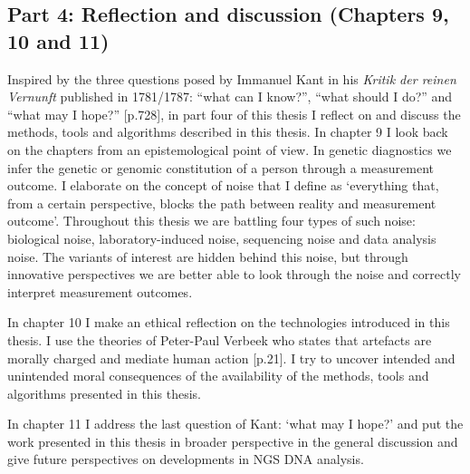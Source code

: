 \subsection[Reflection and discussion]{Part 4: Reflection and discussion \newline (Chapters 9, 10 and 11)}\label{Part4}
Inspired by the three questions posed by Immanuel Kant in his \textsl{Kritik der reinen Vernunft} published in 1781/1787: “what can I know?”, “what should I do?” and “what may I hope?” \cite{Kant_1781a}[p.728], in part four of this thesis I reflect on and discuss the methods, tools and algorithms described in this thesis. 
In chapter 9 I look back on the chapters from an epistemological point of view. 
In genetic diagnostics we infer the genetic or genomic constitution of a person through a measurement outcome. 
I elaborate on the concept of noise that I define as ‘everything that, from a certain perspective, blocks the path between reality and measurement outcome’. 
Throughout this thesis we are battling four types of such noise: biological noise, laboratory-induced noise, sequencing noise and data analysis noise. 
The variants of interest are hidden behind this noise, but through innovative perspectives we are better able to look through the noise and correctly interpret measurement outcomes. 

In chapter 10 I make an ethical reflection on the technologies introduced in this thesis. I use the theories of Peter-Paul Verbeek who states that artefacts are morally charged and mediate human action \cite{Verbeek_2011}[p.21]. 
I try to uncover intended and unintended moral consequences of the availability of the methods, tools and algorithms presented in this thesis. 

In chapter 11 I address the last question of Kant: ‘what may I hope?’ and put the work presented in this thesis in broader perspective in the general discussion and give future perspectives on developments in NGS DNA analysis.

